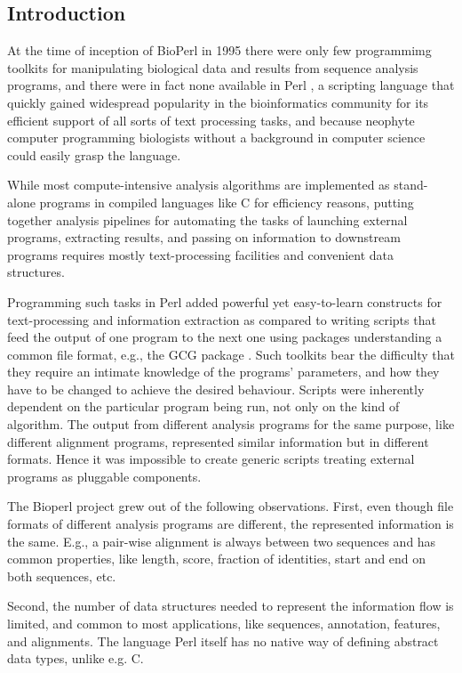 \documentclass{article}
\begin{document}
\begin{twocolumn}

\section{Introduction}

At the time of inception of BioPerl in 1995 \cite{Fullen1995}
there were only few programmimg toolkits for manipulating biological
data and results from sequence analysis programs, and there were in
fact none available in Perl \cite{Wall2000}, a scripting language that
quickly gained widespread popularity in the bioinformatics community
for its efficient support of all sorts of text processing tasks, and
because neophyte computer programming biologists without a background
in computer science could easily grasp the language.

While most compute-intensive analysis algorithms are implemented as
stand-alone programs in compiled languages like C for efficiency
reasons, putting together analysis pipelines for automating the tasks
of launching external programs, extracting results, and passing on
information to downstream programs requires mostly text-processing
facilities and convenient data structures.

Programming such tasks in Perl added powerful yet easy-to-learn
constructs for text-processing and information extraction as compared
to writing scripts that feed the output of one program to the next one
using packages understanding a common file format, e.g., the GCG
package \cite{Devereux1984}.  Such toolkits bear the difficulty that they
require an intimate knowledge of the programs' parameters, and how
they have to be changed to achieve the desired behaviour.  Scripts were
inherently dependent on the particular program being run, not only on
the kind of algorithm.  The output from different analysis programs for
the same purpose, like different alignment programs, represented
similar information but in different formats.  Hence it was impossible
to create generic scripts treating external programs as pluggable
components.

The Bioperl project grew out of the following observations.  First,
even though file formats of different analysis programs are different,
the represented information is the same.  E.g., a pair-wise alignment
is always between two sequences and has common properties, like
length, score, fraction of identities, start and end on both
sequences, etc. 

Second, the number of data structures needed to represent the
information flow is limited, and common to most applications, like
sequences, annotation, features, and alignments.  The language Perl
itself has no native way of defining abstract data types, unlike
e.g. C.


\end{twocolumn}
\end{document}
